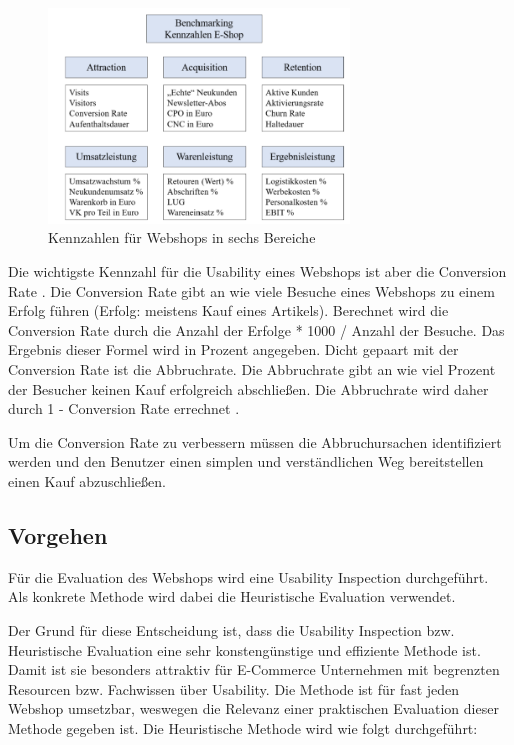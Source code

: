 \documentclass[utf8,biblatex]{lni}
\begin{document}
\begin{figure}[h]
    \centering
    \includegraphics[width=8cm]{images/e-commerce_kennzahlen.png}
    \caption{Kennzahlen für Webshops in sechs Bereiche \cite{Gast2018}}
    \label{fig:kennzahlen}
\end{figure}

Die wichtigste Kennzahl für die Usability eines Webshops ist aber die Conversion Rate \cite{Gast2018}. Die Conversion Rate gibt an wie viele Besuche eines Webshops zu einem Erfolg führen (Erfolg: meistens Kauf eines Artikels). Berechnet wird die Conversion Rate durch die Anzahl der Erfolge * 1000 / Anzahl der Besuche. Das Ergebnis dieser Formel wird in Prozent angegeben. Dicht gepaart mit der Conversion Rate ist die Abbruchrate. Die Abbruchrate gibt an wie viel Prozent der Besucher keinen Kauf erfolgreich abschließen. Die Abbruchrate wird daher durch 1 - Conversion Rate errechnet \cite{Gast2018}.

Um die Conversion Rate zu verbessern müssen die Abbruchursachen identifiziert werden und den Benutzer einen simplen und verständlichen Weg bereitstellen einen Kauf abzuschließen.


\subsection{Vorgehen}
Für die Evaluation des Webshops wird eine Usability Inspection durchgeführt. Als konkrete Methode wird dabei die Heuristische Evaluation verwendet.

Der Grund für diese Entscheidung ist, dass die Usability Inspection bzw. Heuristische Evaluation eine sehr konstengünstige und effiziente Methode ist. Damit ist sie besonders attraktiv für E-Commerce Unternehmen mit begrenzten Resourcen bzw. Fachwissen über Usability. Die Methode ist für fast jeden Webshop umsetzbar, weswegen die Relevanz einer praktischen Evaluation dieser Methode gegeben ist. Die Heuristische Methode wird wie folgt durchgeführt:
\end{document}
